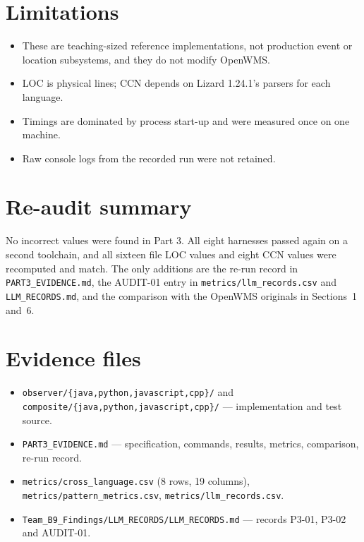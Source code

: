 \documentclass[11pt,a4paper]{article}
\newcommand{\code}[1]{\nolinkurl{#1}}
\begin{document}
\section{Limitations}
\begin{itemize}[nosep]
\item These are teaching-sized reference implementations, not production event or location subsystems, and they do not modify OpenWMS.
\item LOC is physical lines; CCN depends on Lizard 1.24.1's parsers for each language.
\item Timings are dominated by process start-up and were measured once on one machine.
\item Raw console logs from the recorded run were not retained.
\end{itemize}

\section{Re-audit summary}
No incorrect values were found in Part 3. All eight harnesses passed again on a second toolchain, and all sixteen file LOC values and eight CCN values were recomputed and match. The only additions are the re-run record in \code{PART3_EVIDENCE.md}, the AUDIT-01 entry in \code{metrics/llm_records.csv} and \code{LLM_RECORDS.md}, and the comparison with the OpenWMS originals in Sections~1 and~6.

\section{Evidence files}
\begin{itemize}[nosep]
\item \code{observer/\{java,python,javascript,cpp\}/} and \code{composite/\{java,python,javascript,cpp\}/} --- implementation and test source.
\item \code{PART3_EVIDENCE.md} --- specification, commands, results, metrics, comparison, re-run record.
\item \code{metrics/cross_language.csv} (8 rows, 19 columns), \code{metrics/pattern_metrics.csv}, \code{metrics/llm_records.csv}.
\item \code{Team_B9_Findings/LLM_RECORDS/LLM_RECORDS.md} --- records P3-01, P3-02 and AUDIT-01.
\end{itemize}
\end{document}
